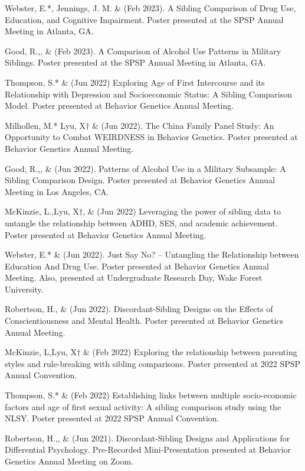 \begin{etaremune}
\item Webster, E.*, Jennings, J. M. \& \meb (Feb 2023). A Sibling Comparison of Drug Use, Education, and Cognitive Impairment. Poster presented at the SPSP Annual Meeting in Atlanta, GA.
\item Good, R.,\noteA \yrh, \&  \meb (Feb 2023). A Comparison of Alcohol Use Patterns in Military Siblings.  Poster presented at the SPSP Annual Meeting in Atlanta, GA.
%
\item Thompson, S.* \& \meb (Jun 2022) Exploring Age of First Intercourse and its Relationship with Depression and Socioeconomic Status: A Sibling Comparison Model.  Poster presented at Behavior Genetics Annual Meeting.
\item Milhollen, M.* Lyu, X$\dagger$ \&  \meb (Jun 2022). The China Family Panel Study: An Opportunity to Combat WEIRDNESS in Behavior Genetics. Poster presented at Behavior Genetics Annual Meeting.
\item Good, R.,\noteA \yrh, \&  \meb (Jun 2022). Patterns of Alcohol Use in a Military Subsample: A Sibling Comparison Design.  Poster presented at Behavior Genetics Annual Meeting in Los Angeles, CA.
%
\item McKinzie, L.,\noteA Lyu, X$\dagger$, \& \meb (Jun 2022) Leveraging the power of sibling data to untangle the relationship between ADHD, SES, and academic achievement. Poster presented at Behavior Genetics Annual Meeting.
%
\item Webster, E.* \& \meb (Jun 2022). Just Say No? – Untangling the Relationship between Education And Drug Use. Poster presented at Behavior Genetics Annual Meeting. Also, presented at Undergraduate Research Day, Wake Forest University.
%
\item Robertson, H.\noteA \jdt, \Joe \&  \meb (Jun 2022). Discordant-Sibling Designs on the Effects of Conscientiousness and Mental Health. Poster presented at Behavior Genetics Annual Meeting.
%
\item McKinzie, L,\noteA Lyu, X$\dagger$ \& \meb (Feb 2022) Exploring the relationship between parenting styles and rule-breaking with sibling comparisons. Poster presented at 2022 SPSP Annual Convention.
%
\item Thompson, S.* \& \meb (Feb 2022) Establishing links between multiple socio-economic factors and age of first sexual activity: A sibling comparison study using the NLSY. Poster presented at 2022 SPSP Annual Convention.
%
\item Robertson, H.,\noteA \Joe, \&  \meb (Jun 2021). Discordant-Sibling Designs and Applications for Differential Psychology. Pre-Recorded Mini-Presentation presented at Behavior Genetics Annual Meeting on Zoom.

\end{etaremune}
